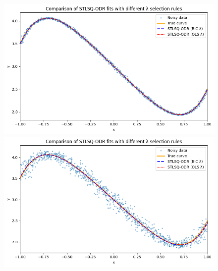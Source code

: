\begin{figure}
\centering
\begin{minipage}{0.45\textwidth}
    \centering
    \includegraphics[width=\linewidth]{MSc_Statistics_Research_Report_Template/images/0.01,0.01.png}
\end{minipage}
\begin{minipage}{0.45\textwidth}
    \centering
    \includegraphics[width=\linewidth]{MSc_Statistics_Research_Report_Template/images/0.05, 0.05.png}
\end{minipage}


\end{figure}
